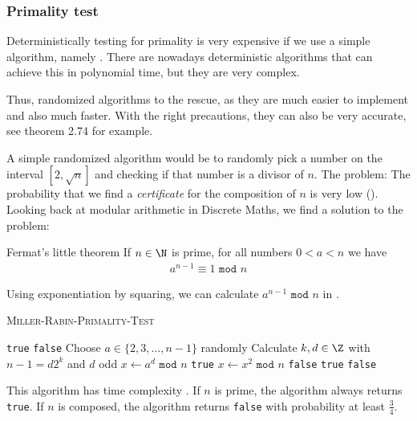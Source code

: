 \subsubsection{Primality test}
Deterministically testing for primality is very expensive if we use a simple algorithm, namely . There are nowadays deterministic algorithms that can achieve this in polynomial time, but they are very complex.

Thus, randomized algorithms to the rescue, as they are much easier to implement and also much faster. With the right precautions, they can also be very accurate, see theorem 2.74 for example.

A simple randomized algorithm would be to randomly pick a number on the interval $[2, \sqrt{n}]$ and checking if that number is a divisor of $n$. The problem: The probability that we find a \textit{certificate} for the composition of $n$ is very low (). Looking back at modular arithmetic in Discrete Maths, we find a solution to the problem:

\begin{theorem}[]{Fermat's little theorem}
    If $n \in \N$ is prime, for all numbers $0 < a < n$ we have
    \begin{align*}
        a^{n - 1} \equiv 1 \texttt{ mod } n
    \end{align*}
\end{theorem}
Using exponentiation by squaring, we can calculate $a^{n - 1} \texttt{ mod } n$ in .

\begin{algorithm}
    \caption{\textsc{Miller-Rabin-Primality-Test}}\label{alg:miller-rabin-primality-test}
    \begin{algorithmic}[1]
                \State \Return \texttt{true}
                \State \Return \texttt{false}
            \EndIf
            \State Choose $a \in \{2, 3, \ldots, n - 1\}$ randomly
            \State Calculate $k, d \in \Z$ with $n - 1 = d2^k$ and $d$ odd 
            \State $x \gets a^d \texttt{ mod } n$
                \State \Return \texttt{true}
            \EndIf
             
                \State $x \gets x^2 \texttt{ mod } n$
                    \State \Return \texttt{false}
                \EndIf
                    \State \Return \texttt{true}
                \EndIf
            \EndWhile
            \State \Return \texttt{false}
        \EndProcedure
    \end{algorithmic}
\end{algorithm}
This algorithm has time complexity . If $n$ is prime, the algorithm always returns \texttt{true}. If $n$ is composed, the algorithm returns \texttt{false} with probability at least $\frac{3}{4}$.


